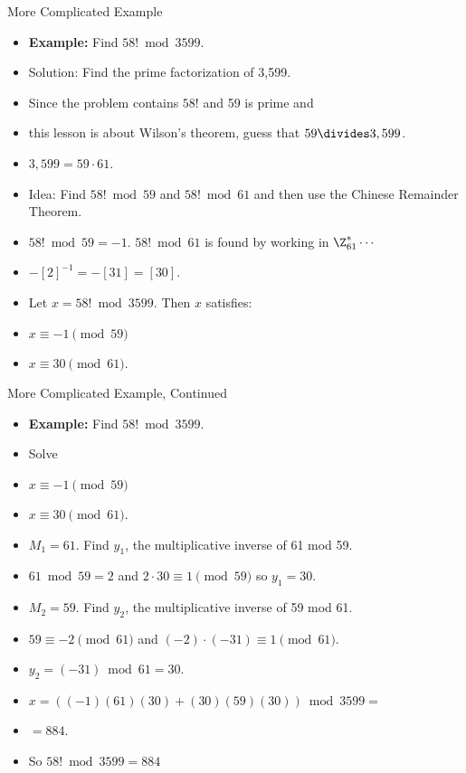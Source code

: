 \documentclass[handout]{beamer}
\begin{document}
\begin{frame}{More Complicated Example}
\begin{itemize}
  \item \textbf{Example:} Find $58! \bmod 3599$.
  \item Solution: Find the prime factorization of 3,599.
  \item Since the problem contains $58!$ and 59 is prime and
  \item this lesson is about Wilson's theorem, guess that $59\divides 3,599$.
  \item $3,599 = 59 \cdot 61$.
  \item Idea: Find $58! \bmod 59$ and $58! \bmod 61$ and then use the Chinese Remainder Theorem.
  \item $58! \bmod 59 = -1$. $58!\bmod 61$ is found by working in $\Z_{61}^* \cdots$
  \item $-[2]^{-1}=-[31]=[30]$.
  \item Let $x=58! \bmod 3599$. Then $x$ satisfies:
  \item $x \equiv -1 \pmod {59}$
  \item $x \equiv 30 \pmod {61}$.
\end{itemize}
\end{frame}

\begin{frame}{More Complicated Example, Continued}
\begin{itemize}
  \item \textbf{Example:} Find $58! \bmod 3599$.
  \item Solve
  \item $x \equiv -1 \pmod {59}$
  \item $x \equiv 30 \pmod {61}$.
  \item $M_1 = 61$. Find $y_1$, the multiplicative inverse of 61 mod 59.
  \item $61 \bmod 59 = 2$ and $2\cdot 30 \equiv 1 \pmod {59}$ so $y_1=30$.
  \item $M_2 = 59$. Find $y_2$, the multiplicative inverse of 59 mod 61.
  \item $59 \equiv -2 \pmod{61}$ and $(-2)\cdot(-31) \equiv 1 \pmod {61}$.
  \item $y_2 = (-31) \bmod 61 = 30$.
  \item $x = \left( (-1)(61)(30) + (30)(59)(30) \right) \bmod 3599=$
  \item $=884$.
  \item So $58! \bmod 3599 = 884$
\end{itemize}
\end{frame}
\end{document}
